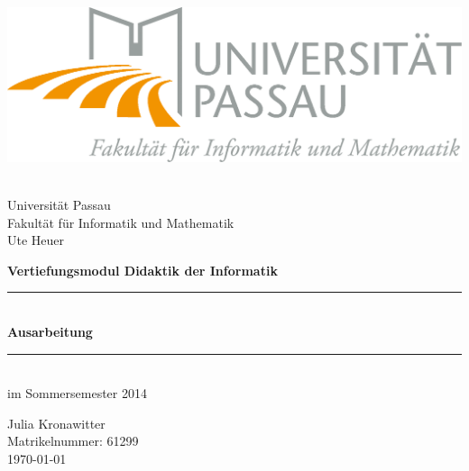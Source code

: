 
\thispagestyle{empty}
%
\begin{center}
\includegraphics[scale=2]{logo.png}
\end{center}
%
\begin{center}
\Large
~\\[0.2cm]
Universität Passau \\
Fakultät für Informatik und Mathematik \\
Ute Heuer \\
\vspace{50pt}
\end{center}
%
{\huge \centering
\textbf{Vertiefungsmodul Didaktik der Informatik}
\vspace{40pt}\\}

%

{\Large{\centering
\rule{\textwidth}{3pt}
~\\[0.01cm]
{\fontsize{30pt}{25pt}\selectfont\bfseries Ausarbeitung}
~\\[0.01cm]
\rule{\textwidth}{3pt}
~\\[0.4cm]
\Large im Sommersemester 2014\\
}
}
\vfill
%
%
%
{\centering
Julia Kronawitter\\[0.3cm]
Matrikelnummer: 61299 \\[0.3cm]
\today\\}